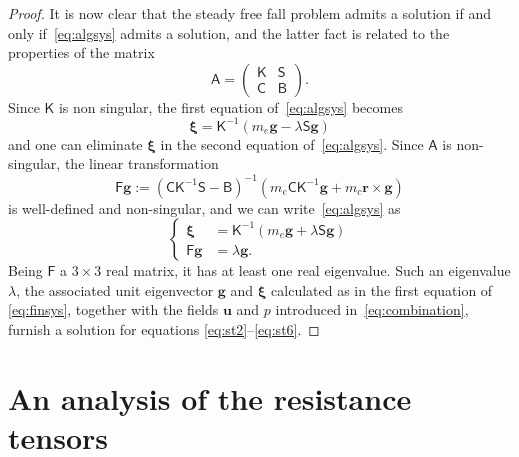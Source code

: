 \documentclass[final]{amsart}
\theoremstyle{definition}
\theoremstyle{definition}
\theoremstyle{remark}
\begin{document}
\begin{proof}
It is now clear that the steady free fall problem admits a solution if
and only if~\eqref{eq:algsys} admits a solution,
and the latter fact is related to the properties of the matrix
\[
{\mathsf A}=
\begin{pmatrix}
{\mathsf K} & {\mathsf S} \\
{\mathsf C} & {\mathsf B}
\end{pmatrix}.
\]
Since ${\mathsf K}$ is non singular, the first equation
of~\eqref{eq:algsys} becomes
\begin{equation*}
{\boldsymbol \xi} ={\mathsf K}^{-1}(m_e{\boldsymbol g}-\lambda{\mathsf S}{\boldsymbol g})
\end{equation*}
and one can eliminate ${\boldsymbol \xi}$ in the second equation
of~\eqref{eq:algsys}. Since ${\mathsf A}$ is non-singular, the linear
transformation
\[
{\mathsf F}{\boldsymbol g}:=({\mathsf C}{\mathsf K}^{-1}{\mathsf S}-{\mathsf B})^{-1}(m_e{\mathsf C}{\mathsf K}^{-1}{\boldsymbol g}+m_c{\boldsymbol r}\times{\boldsymbol g})
\]
is well-defined and non-singular, and we can
write~\eqref{eq:algsys} as
\begin{equation}
\label{eq:finsys}
\left\{
\begin{aligned}
{\boldsymbol \xi} & ={\mathsf K}^{-1}(m_e{\boldsymbol g}+\lambda{\mathsf S}{\boldsymbol g})\\
{\mathsf F}{\boldsymbol g} & =\lambda{\boldsymbol g}.
\end{aligned}
\right.
\end{equation}
Being ${\mathsf F}$ a $3\times 3$ real matrix, it has at least one
real eigenvalue. Such an eigenvalue $\lambda$, the associated unit
eigenvector ${\boldsymbol g}$ and ${\boldsymbol \xi}$ calculated as in the first equation
of \eqref{eq:finsys}, together with the fields ${\boldsymbol u}$ and $p$
introduced in~\eqref{eq:combination}, furnish a solution for equations
\eqref{eq:st2}--\eqref{eq:st6}.
\end{proof}

\section{An analysis of the resistance tensors}\label{sec:res}
\end{document}
